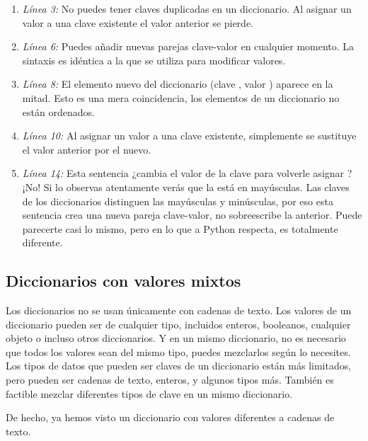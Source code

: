 \begin{enumerate}

\item \emph{Línea 3:} No puedes tener claves duplicadas en un diccionario. Al asignar un valor a una clave existente el valor anterior se pierde.

\item \emph{Línea 6:} Puedes añadir nuevas parejas clave-valor en cualquier momento. La sintaxis es idéntica a la que se utiliza para modificar valores.

\item \emph{Línea 8:} El elemento nuevo del diccionario (clave , valor ) aparece en la mitad. Esto es una mera coincidencia, los elementos de un diccionario no están ordenados.

\item \emph{Línea 10:} Al asignar un valor a una clave existente, simplemente se sustituye el valor anterior por el nuevo.

\item \emph{Línea 14:} Esta sentencia ¿cambia el valor de la clave  para volverle asignar ? ¡No! Si lo observas atentamente verás que la  está en mayúsculas. Las claves de los diccionarios distinguen las mayúsculas y minúsculas, por eso esta sentencia crea una nueva pareja clave-valor, no sobreescribe la anterior. Puede parecerte casi lo mismo, pero en lo que a Python respecta, es totalmente diferente.

\end{enumerate}

\subsection{Diccionarios con valores mixtos}

Los diccionarios no se usan únicamente con cadenas de texto. Los valores de un diccionario pueden ser de cualquier tipo, incluidos enteros, booleanos, cualquier objeto o incluso otros diccionarios. Y en un mismo diccionario, no es necesario que todos los valores sean del mismo tipo, puedes mezclarlos según lo necesites. Los tipos de datos que pueden ser claves de un diccionario están más limitados, pero pueden ser cadenas de texto, enteros, y algunos tipos más. También es factible mezclar diferentes tipos de clave en un mismo diccionario.

De hecho, ya hemos visto un diccionario con valores diferentes a cadenas de texto.

